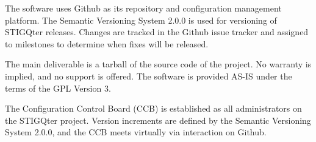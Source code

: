 \documentclass[letterpaper, 10pt, twoside]{article}
\begin{document}
The software uses Github as its repository and configuration management platform. The Semantic Versioning System 2.0.0 is used for versioning of STIGQter releases.\autocite{preston2013semantic} Changes are tracked in the Github issue tracker and assigned to milestones to determine when fixes will be released.

The main deliverable is a tarball of the source code of the project. No warranty is implied, and no support is offered. The software is provided AS-IS under the terms of the GPL Version 3.

The Configuration Control Board (CCB) is established as all administrators on the STIGQter project. Version increments are defined by the Semantic Versioning System 2.0.0, and the CCB meets virtually via interaction on Github.

\clearpage
\printbibliography
\end{document}
